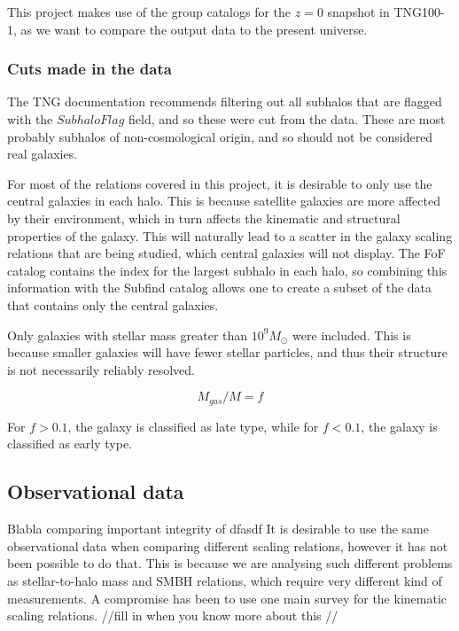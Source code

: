 This project makes use of the group catalogs for the $z = 0$ snapshot in TNG100-1, as we want to compare the output data to the present universe.

\subsubsection{Cuts made in the data} %

The TNG documentation recommends filtering out all subhalos that are flagged with the $SubhaloFlag$ field, and so these were cut from the data. These are most probably subhalos of non-cosmological origin, and so should not be considered real galaxies.

For most of the relations covered in this project, it is desirable to only use the central galaxies in each halo. This is because satellite galaxies are more affected by their environment, which in turn affects the kinematic and structural properties of the galaxy. This will naturally lead to a scatter in the galaxy scaling relations that are being studied, which central galaxies will not display. The FoF catalog contains the index for the largest subhalo in each halo, so combining this information with the Subfind catalog allows one to create a subset of the data that contains only the central galaxies.

Only galaxies with stellar mass greater than $10^9 M_{\odot}$ were included. This is because smaller galaxies will have fewer stellar particles, and thus their structure is not necessarily reliably resolved.

\begin{equation}
    M_{gas}/M  = f
\end{equation}

For $f > 0.1$, the galaxy is classified as late type, while for $f< 0.1$, the galaxy is classified as early type.

\subsection{Observational data}
Blabla comparing important integrity of dfasdf
It is desirable to use the same observational data when comparing different scaling relations, however it has not been possible to do that. This is because we are analysing such different problems as stellar-to-halo mass and SMBH relations, which require very different kind of measurements. A compromise has been to use one main survey for the kinematic scaling relations. //fill in when you know more about this //

